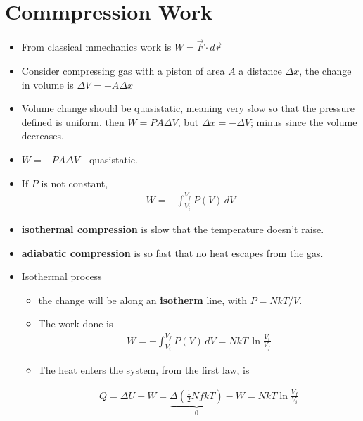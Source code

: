 \documentclass{book}
\begin{document}
\section{Commpression Work}%
\label{sec:Compression Work}

\begin{itemize}
	\item From classical mmechanics work is $W = \vec{F} \cdot d\vec{r}$
	\item  Consider compressing gas with a piston of area $A$ a distance $\Delta{x}$,
	      the change in volume is $\Delta{V} = -A \Delta{x}$
	\item Volume change should be quasistatic, meaning very slow so that the pressure defined is uniform.
	      then $W = P A \Delta{V}$, but $\Delta{x} = - \Delta{V}$; minus since the volume decreases.
	\item $W =- P A \Delta{V}$  -  quasistatic.
	\item If $P$ is not constant,
	      \begin{align}
		      \label{eq:gas work}
		      W = - \int_{V_i}^{V_f} P(V) \, dV
	      \end{align}

	\item \textbf{isothermal compression} is slow that the temperature doesn't raise.
	\item \textbf{adiabatic compression} is so fast that no heat escapes from the gas.
	\item Isothermal process
	      \begin{itemize}
		      \item  the change will be along an \textbf{ isotherm } line,
		            with $P = NkT / V$.
		      \item The work done is
		            \begin{align}
			            W  = - \int_{V_i}^{V_f} P(V) \, dV = NkT \, \ln{ \frac{V_{i}}{V_{f}} }
		            \end{align}
		      \item The heat enters the system, from the first law, is

		            \begin{align}
			            Q = \Delta{U} - W = \underbrace{ \Delta{( \frac{1}{2}NfkT )} }_{0} - W = NkT \ln{\frac{V_{f}}{V_{i}}}
		            \end{align}
	      \end{itemize}


\end{itemize}
\end{document}
